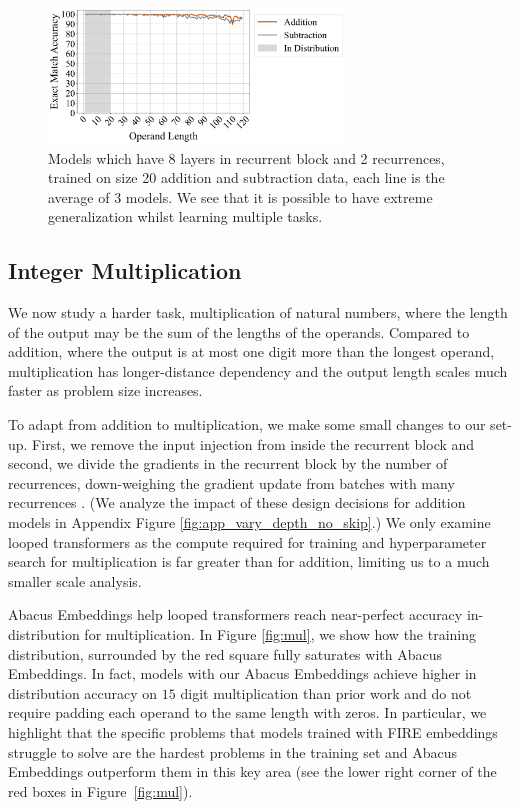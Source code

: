 \documentclass{article}
\begin{document}
\begin{figure}[hb!]
    \centering
    \includegraphics[width=0.7\textwidth]{Figures/plot_21.pdf}
    \caption{
    Models which have 8 layers in recurrent block and 2 recurrences, trained on size 20 addition and subtraction data, each line is the average of 3 models.
    We see that it is possible to have extreme generalization whilst learning multiple tasks.
    }
    \label{fig:add_sub}
\end{figure}

\subsection{Integer Multiplication}

We now study a harder task, multiplication of natural numbers, where the length of the output may be the sum of the lengths of the operands.
Compared to addition, where the output is at most one digit more than the longest operand, multiplication has longer-distance dependency and the output length scales much faster as problem size increases.

To adapt from addition to multiplication, we make some small changes to our set-up.
First, we remove the input injection from inside the recurrent block and second, we divide the gradients in the recurrent block by the number of recurrences, down-weighing the gradient update from batches with many recurrences \citep{bansal2022endtoend}.
(We analyze the impact of these design decisions for addition models in Appendix Figure \ref{fig:app_vary_depth_no_skip}.)
We only examine looped transformers as the compute required for training and hyperparameter search for multiplication is far greater than for addition, limiting us to a much smaller scale analysis.

Abacus Embeddings help looped transformers reach near-perfect accuracy in-distribution for multiplication.
In Figure \ref{fig:mul}, we show how the training distribution, surrounded by the red square fully saturates with Abacus Embeddings.
In fact, models with our Abacus Embeddings achieve higher in distribution accuracy on \(15\) digit multiplication than prior work \citep{shen2023positional} and do not require padding each operand to the same length with zeros.
In particular, we highlight that the specific problems that models trained with FIRE embeddings struggle to solve are the hardest problems in the training set and Abacus Embeddings outperform them in this key area (see the lower right corner of the red boxes in Figure~\ref{fig:mul}).
\end{document}
